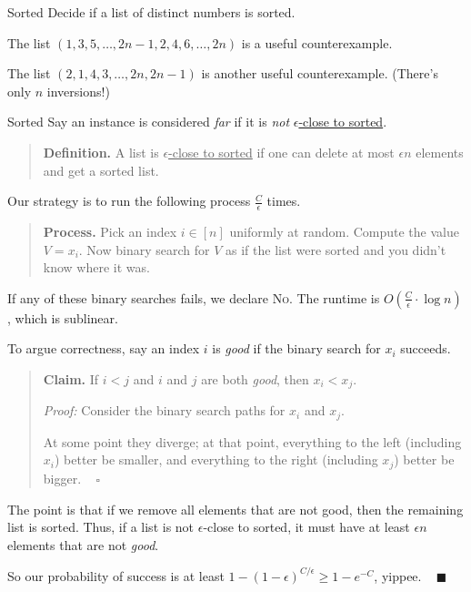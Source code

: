 \begin{problem}{Sorted}
    Decide if a list of distinct numbers is sorted.
\end{problem}

\begin{remark}
    The list $(1, 3, 5, \dots, 2n - 1, 2, 4, 6, \dots, 2n)$ is a useful counterexample.

    The list $(2, 1, 4, 3, \dots, 2n, 2n - 1)$ is another useful counterexample.  (There's only $n$ inversions!)
\end{remark}

\begin{solution}{Sorted}
    Say an instance is considered \emph{far} if it is \emph{not} \underline{$\epsilon$-close to sorted}.
    \begin{quote}
        \textbf{Definition.} A list is \underline{$\epsilon$-close to sorted} if one can delete at most $\epsilon n$ elements and get a sorted list.
    \end{quote}
    Our strategy is to run the following process $\frac{C}{\epsilon}$ times.
    \begin{quote}
        \textbf{Process.} Pick an index $i \in [n]$ uniformly at random.  Compute the value $V = x_i$.  Now binary search for $V$ as if the list were sorted and you didn't know where it was.
    \end{quote}
    If any of these binary searches fails, we declare \textsc{No}.
    The runtime is $O\left (\frac{C}{\epsilon} \cdot \log n\right )$, which is sublinear.

    To argue correctness, say an index $i$ is \emph{good} if the binary search for $x_i$ succeeds.
    \begin{quote}
        \textbf{Claim.} If $i < j$ and $i$ and $j$ are both \emph{good}, then $x_i < x_j$.

        \emph{Proof:} Consider the binary search paths for $x_i$ and $x_j$.
        
        At some point they diverge; at that point, everything to the left (including $x_i$) better be smaller, and everything to the right (including $x_j$) better be bigger. ~ $\square$
    \end{quote}
    The point is that if we remove all elements that are not good, then the remaining list is sorted.  Thus, if a list is not $\epsilon$-close to sorted, it must have at least $\epsilon n$ elements that are not \emph{good}.
    
    So our probability of success is at least $1 - \left(1 - \epsilon\right)^{C/\epsilon} \geq 1 - e^{-C}$, yippee. ~ $\blacksquare$
\end{solution}

